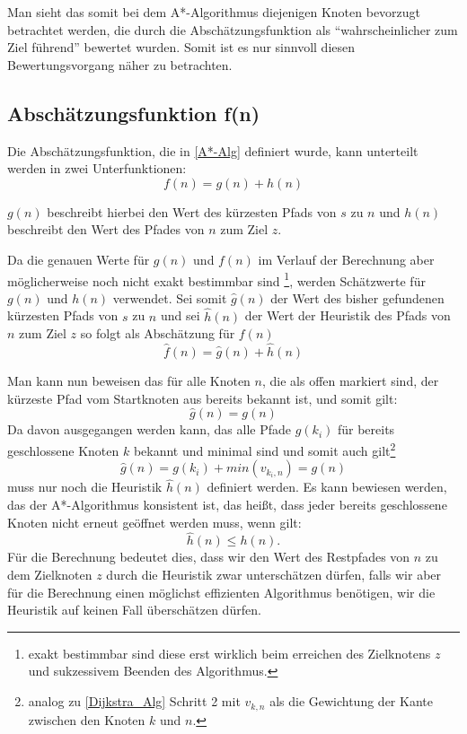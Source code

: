 		Man sieht das somit bei dem A*-Algorithmus diejenigen Knoten bevorzugt betrachtet werden, die durch die Abschätzungsfunktion als "`wahrscheinlicher zum Ziel führend"' bewertet wurden. Somit ist es nur sinnvoll diesen Bewertungsvorgang näher zu betrachten. 
		
	
	
	
	\subsection{Abschätzungsfunktion f(n)}
		\label{Abschaetz}
		Die Abschätzungsfunktion, die in \ref{A*-Alg} definiert wurde, kann unterteilt werden in zwei Unterfunktionen\cite{Hart1968}:
		\begin{equation}
			f(n)=g(n)+h(n)
		\end{equation}
		
		$g(n)$ beschreibt hierbei den Wert des kürzesten Pfads von $s$ zu $n$ und $h(n)$ beschreibt den Wert des Pfades von $n$ zum Ziel $z$.
		
		Da die genauen Werte für $g(n)$ und $f(n)$ im Verlauf der Berechnung aber möglicherweise noch nicht exakt bestimmbar sind \footnote{exakt bestimmbar sind diese erst wirklich beim erreichen des Zielknotens $z$ und sukzessivem Beenden des Algorithmus.}, werden Schätzwerte für $g(n)$ und $h(n)$ verwendet. Sei somit $\hat{g}(n)$ der Wert des bisher gefundenen kürzesten Pfads von $s$ zu $n$ und sei $\hat{h}(n)$ der Wert der Heuristik des Pfads von $n$ zum Ziel $z$ so folgt als Abschätzung für $f(n)$
		\begin{equation}
			\hat{f}(n)=\hat{g}(n)+\hat{h}(n)
		\end{equation}
		
		Man kann nun beweisen das für alle Knoten $n$, die als offen markiert sind, der kürzeste Pfad vom Startknoten aus bereits bekannt ist, und somit gilt:
		\begin{equation}
			\hat{g}(n)=g(n)
		\end{equation}
		Da davon ausgegangen werden kann, das alle Pfade $g(k_i)$ für bereits geschlossene Knoten $k$ bekannt und minimal sind und somit auch gilt\footnote{analog zu \ref{Dijkstra_Alg} Schritt 2 mit $v_{k,n}$ als die Gewichtung der Kante zwischen den Knoten $k$ und $n$.}
		\begin{equation}
			\hat{g}(n)=g(k_i)+min(v_{k_i,n})=g(n)
		\end{equation}
		 muss nur noch die Heuristik $\hat{h}(n)$ definiert werden.
		 Es kann bewiesen werden, das der A*-Algorithmus konsistent ist, das heißt, dass jeder bereits geschlossene Knoten nicht erneut geöffnet werden muss, wenn gilt:
		 \begin{equation}
			 \hat{h}(n)\le h(n).
		 \end{equation}
		 Für die Berechnung bedeutet dies, dass wir den Wert des Restpfades von $n$ zu dem Zielknoten $z$ durch die Heuristik zwar unterschätzen dürfen, falls wir aber für die Berechnung einen möglichst effizienten Algorithmus benötigen, wir die Heuristik auf keinen Fall überschätzen dürfen.
		
